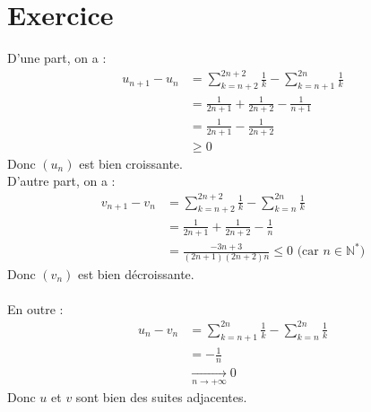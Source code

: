 \documentclass{report}
\begin{document}
\section{Exercice}
D'une part, on a : 
\begin{align*}
    u_{n+1} - u_n &= \sum_{k=n+2}^{2n+2} \frac{1}{k} - \sum_{k=n+1}^{2n} \frac{1}{k} \\
    &= \frac{1}{2n+1} + \frac{1}{2n+2} - \frac{1}{n+1} \\
    &= \frac{1}{2n+1} - \frac{1}{2n+2} \\
    &\geq 0
\end{align*}
Donc $(u_n)$ est bien croissante. \\
D'autre part, on a : 
\begin{align*}
    v_{n+1} - v_n &= \sum_{k=n+2}^{2n+2} \frac{1}{k} - \sum_{k=n}^{2n} \frac{1}{k} \\
    &= \frac{1}{2n+1} + \frac{1}{2n+2} - \frac{1}{n} \\
    &= \frac{-3n+3}{(2n+1)(2n+2)n}
    \leq 0 \text{ (car $n \in \mathbb{N}^*$)}
\end{align*}
Donc $(v_n)$ est bien décroissante. \\ \\
En outre : 
\begin{align*}
    u_n - v_n &= \sum_{k=n+1}^{2n} \frac{1}{k} - \sum_{k=n}^{2n} \frac{1}{k} \\
    &= -\frac{1}{n} \\
    &\underset{n \to +\infty}{\longrightarrow} 0
\end{align*}
Donc $u$ et $v$ sont bien des suites adjacentes. 

\setcounter{section}{16}
\end{document}
